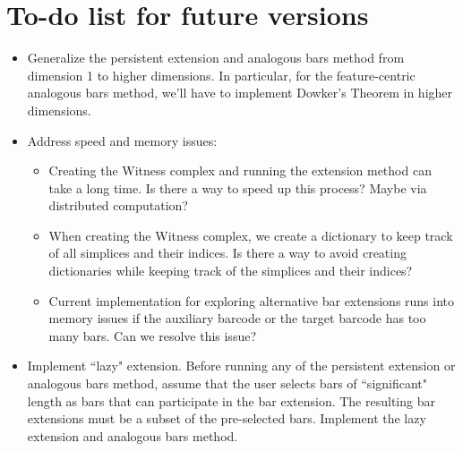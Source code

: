 \documentclass{article}
\begin{document}
\section{To-do list for future versions}
\begin{itemize}
\item Generalize the persistent extension and analogous bars method from dimension 1 to higher dimensions. In particular, for the feature-centric analogous bars method, we'll have to implement Dowker's Theorem in higher dimensions. 
\item Address speed and memory issues: 
	\begin{itemize}
	\item Creating the Witness complex and running the extension method can take a long time. Is there a way to speed up this process? Maybe via distributed computation?
	\item When creating the Witness complex, we create a dictionary to keep track of all simplices and their indices. Is there a way to avoid creating dictionaries while keeping track of the simplices and their indices?
	\item Current implementation for exploring alternative bar extensions runs into memory issues if the auxiliary barcode or the target barcode has too many bars. Can we resolve this issue?	
	\end{itemize}
\item Implement ``lazy" extension. Before running any of the persistent extension or analogous bars method, assume that the user selects bars of ``significant" length as bars that can participate in the bar extension. The resulting bar extensions must be a subset of the pre-selected bars. Implement the lazy extension and analogous bars method.
\end{itemize}
\end{document}
